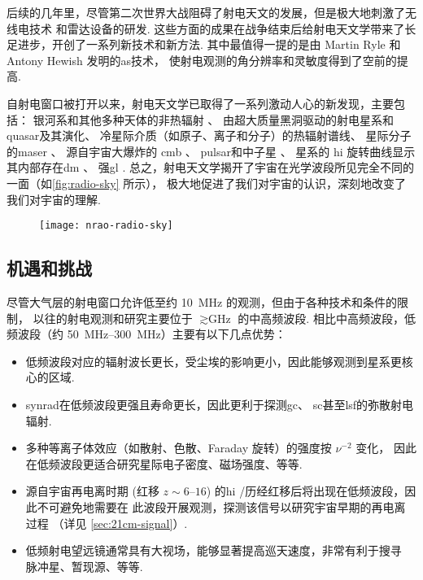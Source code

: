 后续的几年里，尽管第二次世界大战阻碍了射电天文的发展，但是极大地刺激了无线电技术
和雷达设备的研发.
这些方面的成果在战争结束后给射电天文学带来了长足进步，开创了一系列新技术和新方法.
其中最值得一提的是由 Martin Ryle 和 Antony Hewish 发明的\ac{as}技术，
使射电观测的角分辨率和灵敏度得到了空前的提高.

自射电窗口被打开以来，射电天文学已取得了一系列激动人心的新发现，主要包括：
银河系和其他多种天体的非热辐射 \cite{reber1940}、
由超大质量黑洞驱动的射电星系\cite{baade1954}和\ac{quasar}\cite{hazard1963,schmidt1963}及其演化、
冷星际介质（如原子、离子和分子）的热辐射谱线、
星际分子的\ac{maser} \cite{weaver1965}、
源自宇宙大爆炸的 \ac{cmb} \cite{penzias1965}、
\ac{pulsar}和中子星 \cite{hewish1968}、
星系的 \ac{hi} 旋转曲线显示其内部存在\ac{dm} \cite{roberts1975}、
强\ac{gl} \cite{walsh1979}.
总之，射电天文学揭开了宇宙在光学波段所见完全不同的一面（如\autoref{fig:radio-sky} 所示），
极大地促进了我们对宇宙的认识，深刻地改变了我们对宇宙的理解.

\begin{figure}[htp]
  \centering
  \texttt{[image: nrao-radio-sky]}
  \label{fig:radio-sky}
\end{figure}

\subsection{机遇和挑战}

尽管大气层的射电窗口允许低至约 \SI{10}{\MHz} 的观测，但由于各种技术和条件的限制，
以往的射电观测和研究主要位于 $\gtrsim \si{\GHz}$ 的中高频波段.
相比中高频波段，低频波段（约 \SIrange{50}{300}{\MHz}）主要有以下几点优势：
\begin{itemize}
  \item 低频波段对应的辐射波长更长，受尘埃的影响更小，因此能够观测到星系更核心的区域.
  \item \ac{synrad}在低频波段更强且寿命更长，因此更利于探测\ac{gc}、
    \ac{sc}甚至\ac{lsf}的弥散射电辐射.
  \item 多种等离子体效应（如散射、色散、Faraday 旋转）的强度按 $\nu^{-2}$ 变化，
    因此在低频波段更适合研究星际电子密度、磁场强度、等等.
  \item 源自宇宙再电离时期 (红移 $z \sim \numrange{6}{16}$)
    的\ac{hi} \hisignal/历经红移后将出现在低频波段，因此不可避免地需要在
    此波段开展观测，探测该信号以研究宇宙早期的再电离过程
    （详见 \autoref{sec:21cm-signal}）.
  \item 低频射电望远镜通常具有大视场，能够显著提高巡天速度，非常有利于搜寻
    脉冲星、暂现源、等等.
\end{itemize}

